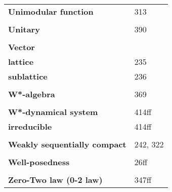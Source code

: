 \documentclass[10pt]{scrartcl}
\begin{document}
\begin{longtable}{>{\bfseries}p{6cm}p{8cm}}
\textbf{Unimodular function} & 313 \\
\\
\textbf{Unitary} & 390 \\
\\
\textbf{Vector} & \\
\quad lattice & 235 \\
\quad sublattice & 236 \\
\\
\textbf{W*-algebra} & 369 \\
\\
\textbf{W*-dynamical system} & 414ff \\
\quad irreducible & 414ff \\
\\
\textbf{Weakly sequentially compact} & 242, 322 \\
\\
\textbf{Well-posedness} & 26ff \\
\\
\textbf{Zero-Two law (0-2 law)} & 347ff \\

\end{longtable}
\end{document}
